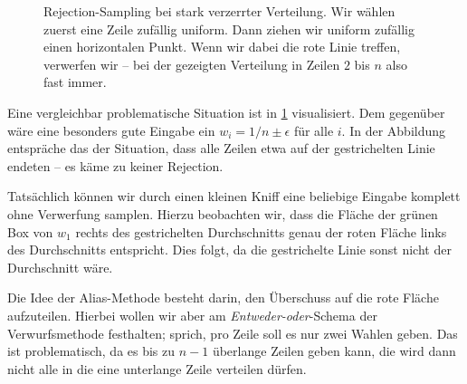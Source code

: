 \begin{figure}
    \begin{center}
        \def\w{5cm}
        \def\h{5mm}
    \end{center}
    \caption{
        Rejection-Sampling bei stark verzerrter Verteilung.
        Wir wählen zuerst eine Zeile zufällig uniform.
        Dann ziehen wir uniform zufällig einen horizontalen Punkt.
        Wenn wir dabei die rote Linie treffen, verwerfen wir -- bei der gezeigten Verteilung in Zeilen $2$ bis $n$ also fast immer.
    }
    \label{fig:alias-tab-motivation}
\end{figure}

Eine vergleichbar problematische Situation ist in \cref{fig:alias-tab-motivation} visualisiert.
Dem gegenüber wäre eine besonders gute Eingabe ein $w_i = 1/n \pm \epsilon$ für alle $i$.
In der Abbildung entspräche das der Situation, dass alle Zeilen etwa auf der gestrichelten Linie endeten -- es käme zu keiner Rejection.

Tatsächlich können wir durch einen kleinen Kniff eine beliebige Eingabe komplett ohne Verwerfung samplen.
Hierzu beobachten wir, dass die Fläche der grünen Box von $w_1$ rechts des gestrichelten Durchschnitts genau der roten Fläche links des Durchschnitts entspricht.
Dies folgt, da die gestrichelte Linie sonst nicht der Durchschnitt wäre.

Die Idee der Alias-Methode besteht darin, den Überschuss auf die rote Fläche aufzuteilen.
Hierbei wollen wir aber am \emph{Entweder-oder}-Schema der Verwurfsmethode festhalten;
sprich, pro Zeile soll es nur zwei Wahlen geben.
Das ist problematisch, da es bis zu $n-1$ überlange Zeilen geben kann, die wird dann nicht alle in die eine unterlange Zeile verteilen dürfen.

